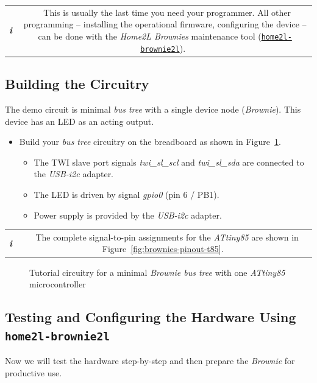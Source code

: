 \documentclass[12pt,english,parskip=half,headheight=19pt]{scrreprt}
\newcommand{\figsvg}[2][]{}            %
\newcommand{\figsvg}[2][]{\href{#2}{}} %
\newcommand{\infobox}[1]{
  \par
  \medskip
  \hfill
  \setlength\arrayrulewidth{1pt}
  \begin{tabular}[t]{c|c|}
    \parbox{1.8em}{\hfill\textit{\Huge\textbf{i}\,}}
    &
    \,\parbox{0.89\linewidth}{\setlength{\parskip}{0.5em} \small #1}\,
  \end{tabular}
  \medskip
  \par
}
\newcommand{\idx}[1]{#1\index{#1}}
\newcommand{\reftool}[1]{\hyperref[tool:#1]{\texttt{\idx{#1}}}}
\begin{document}
\infobox{
  This is usually the last time you need your programmer. All other programming --
  installing the operational firmware, configuring the device -- can be done with the
  \textit{Home2L Brownies} maintenance tool (\reftool{home2l-brownie2l}).
}



\subsection{Building the Circuitry}
\label{sec:tutorial-brownies-circuit}

The demo circuit is minimal \textit{bus tree} with a single device node (\textit{Brownie}). This device has an LED as an acting output.

\begin{itemize}[$\blacktriangleright$]
  \item
    Build your \textit{bus tree} circuitry on the breadboard as shown in
    Figure~\ref{fig:tutorial-circuit}.
    \begin{itemize}
      \item The TWI slave port signals \textit{twi\_sl\_scl} and \textit{twi\_sl\_sda} are connected
            to the \textit{USB-i2c} adapter.
      \item The LED is driven by signal \textit{gpio0} (pin 6 / PB1).
      \item Power supply is provided by the \textit{USB-i2c} adapter.
    \end{itemize}
\end{itemize}

\infobox{
  The complete signal-to-pin assignments for the \textit{ATtiny85} are shown in
  Figure~\ref{fig:brownies-pinout-t85}.
}

\begin{figure}[ht]
  \centering
  \figsvg[inkscapearea=page]{figs/tutorial-circuit.svg}
  \caption[l]{Tutorial circuitry for a minimal \textit{Brownie bus tree} with one \textit{ATtiny85} microcontroller}
  \label{fig:tutorial-circuit}
\end{figure}



\subsection{Testing and Configuring the Hardware Using \texttt{home2l-brownie2l}}
\label{sec:tutorial-brownies-brownie2l}

Now we will test the hardware step-by-step and then prepare the \textit{Brownie} for productive use.
\end{document}
